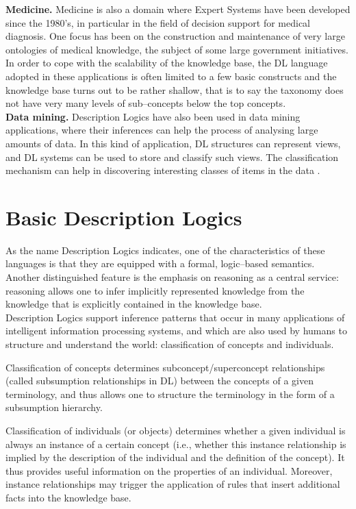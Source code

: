 \documentclass[a4paper, 11pt, oneside]{duthesis}
\begin{document}
\textbf{Medicine.} Medicine is also a domain where Expert Systems have been developed since the 1980’s, in particular in the field of decision support for medical diagnosis. One focus has been on the construction and maintenance of very large ontologies of medical knowledge, the subject of some large government initiatives.
In order to cope with the scalability of the knowledge base, the DL language adopted in these applications is often limited to a few basic constructs and the knowledge base turns out to be rather shallow, that is to say the taxonomy does not have very many levels of sub--concepts below the top concepts.\\

\textbf{Data mining.} Description Logics have also been used in data mining applications, where their inferences can help the process of analysing large amounts of data.
In this kind of application, DL structures can represent views, and DL systems can be used to store and classify such views. The classification mechanism can help in discovering interesting classes of items in the data
\cite{Nardi:2003:IDL:885746.885748}.

\newpage

\section{Basic Description Logics}
As the name Description Logics indicates, one of the characteristics of these languages is that they are equipped with a formal, logic--based semantics.
Another distinguished feature is the emphasis on reasoning as a central service: reasoning allows one to infer implicitly represented knowledge from the knowledge that is explicitly contained in the knowledge base.\\

Description Logics support inference patterns that occur in many applications of intelligent information processing systems, and which are also used by humans to structure and understand the world: classification of concepts and individuals.

Classification of concepts determines subconcept/superconcept relationships (called subsumption relationships in DL) between the concepts of a given terminology, and thus allows one to structure the terminology in the form of a subsumption hierarchy.

Classification of individuals (or objects) determines whether a given individual is always an instance of a certain concept (i.e., whether this instance relationship is implied by the description of the individual and the definition of the concept). It thus provides useful information on the properties of an individual.
Moreover, instance relationships may trigger the application of rules that insert additional facts into the knowledge base.\\
\end{document}
